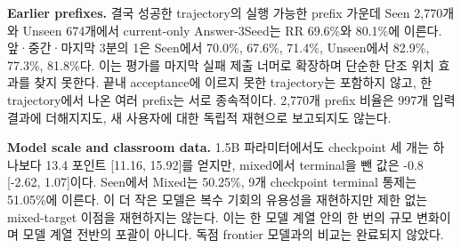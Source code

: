 \documentclass[10pt,conference]{IEEEtran}
\begin{document}
\noindent\textbf{Earlier prefixes.} 결국 성공한 trajectory의 실행 가능한 prefix 가운데 Seen 2,770개와 Unseen 674개에서 current-only Answer-3Seed는 RR 69.6\%와 80.1\%에 이른다. 앞·중간·마지막 3분의 1은 Seen에서 70.0\%, 67.6\%, 71.4\%, Unseen에서 82.9\%, 77.3\%, 81.8\%다. 이는 평가를 마지막 실패 제출 너머로 확장하며 단순한 단조 위치 효과를 찾지 못한다. 끝내 acceptance에 이르지 못한 trajectory는 포함하지 않고, 한 trajectory에서 나온 여러 prefix는 서로 종속적이다. 2,770개 prefix 비율은 997개 입력 결과에 더해지지도, 새 사용자에 대한 독립적 재현으로 보고되지도 않는다.

\noindent\textbf{Model scale and classroom data.} 1.5B 파라미터에서도 checkpoint 세 개는 하나보다 13.4 포인트 [11.16, 15.92]를 얻지만, mixed에서 terminal을 뺀 값은 -0.8 [-2.62, 1.07]이다. Seen에서 Mixed는 50.25\%, 9개 checkpoint terminal 통제는 51.05\%에 이른다. 이 더 작은 모델은 복수 기회의 유용성을 재현하지만 제한 없는 mixed-target 이점을 재현하지는 않는다. 이는 한 모델 계열 안의 한 번의 규모 변화이며 모델 계열 전반의 포괄이 아니다. 독점 frontier 모델과의 비교는 완료되지 않았다.
\end{document}
